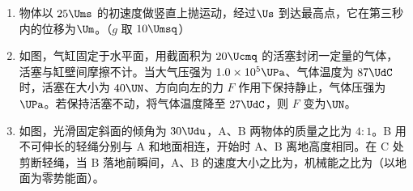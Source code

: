 \documentclass[\gkver]{gaokaozhenti}
\begin{document}
\begin{enumerate}
\item
物体以 $25\Ums$ 的初速度做竖直上抛运动，经过$\Us$ 到达最高点，它在第三秒内的位移为$\Um$。（$g$ 取 $10\Umsq$）

\item
如图，气缸固定于水平面，用截面积为 $20\Ucmq$ 的活塞封闭一定量的气体，活塞与缸壁间摩擦不计。当大气压强为 $1.0\times10^{5}\UPa$、气体温度为 $87\UdC$ 时，活塞在大小为 $40\UN$、方向向左的力 $F$ 作用下保持静止，气体压强为$\UPa$。若保持活塞不动，将气体温度降至 $27\UdC$，则 $F$ 变为$\UN$。
\onepicture[align=right, w=2.17cm]{}

\item
如图，光滑固定斜面的倾角为 $30\Udu$，A、B 两物体的质量之比为 $4:1$。B 用不可伸长的轻绳分别与 A 和地面相连，开始时 A、B 离地高度相同。在 C 处剪断轻绳，当 B 落地前瞬间，A、B 的速度大小之比为，机械能之比为（以地面为零势能面）。
\onepicture[align=right, w=3.49cm]{}


\end{enumerate}
\end{document}
